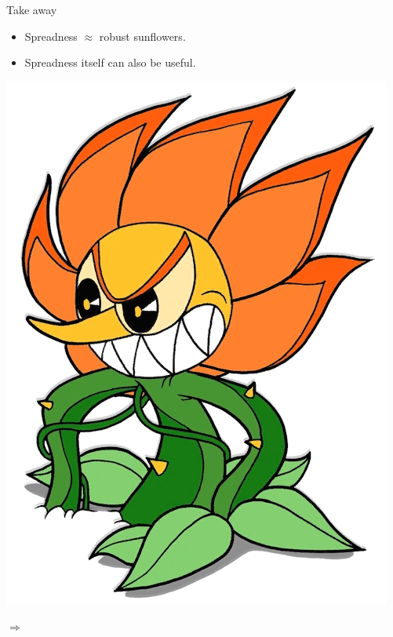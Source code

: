 \begin{frame}{Take away}

    \begin{itemize}
        \item Spreadness $\approx$ robust sunflowers.
        \item Spreadness itself can also be useful.
    \end{itemize}

    \vspace{0.5cm}
    \pause
    
    \begin{minipage}{0.4\linewidth}
        \centering
        \includegraphics[scale = 0.15]{pics/cagney2.png}
    \end{minipage}
    \begin{minipage}{0.15\linewidth}
        \centering
        $\Rightarrow$
    \end{minipage}
    \begin{minipage}{0.4\linewidth}

\end{minipage}
\end{frame}
